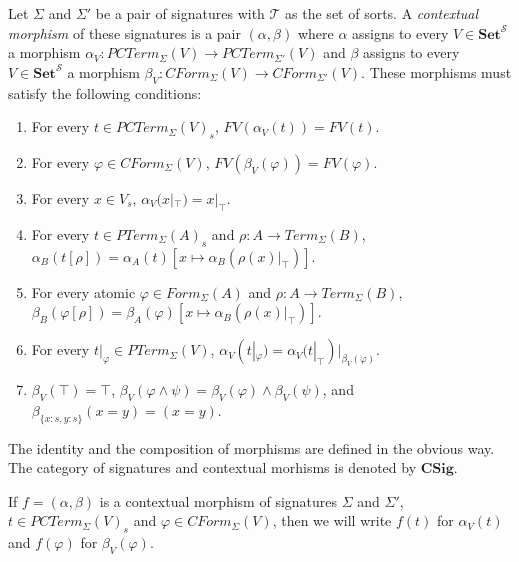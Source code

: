 \documentclass{amsart}
\theoremstyle{definition}
\theoremstyle{remark}
\newcommand{\cat}[1]{\mathbf{#1}}
\newcommand{\Set}{\cat{Set}}
\newcommand{\CSig}{\cat{CSig}}
\numberwithin{figure}{section}
\begin{document}
\begin{defn}
Let $\Sigma$ and $\Sigma'$ be a pair of signatures with $\mathcal{T}$ as the set of sorts.
A \emph{contextual morphism} of these signatures is a pair $(\alpha,\beta)$ where $\alpha$ assigns to every $V \in \Set^\mathcal{S}$
a morphism $\alpha_V : PCTerm_\Sigma(V) \to PCTerm_{\Sigma'}(V)$
and $\beta$ assigns to every $V \in \Set^\mathcal{S}$ a morphism $\beta_V : CForm_\Sigma(V) \to CForm_{\Sigma'}(V)$.
These morphisms must satisfy the following conditions:
\begin{enumerate}
\item For every $t \in PCTerm_\Sigma(V)_s$, $FV(\alpha_V(t)) = FV(t)$.
\label{mor-sig-a-fv}
\item For every $\varphi \in CForm_\Sigma(V)$, $FV(\beta_V(\varphi)) = FV(\varphi)$.
\label{mor-sig-b-fv}
\item For every $x \in V_s$, $\alpha_V(x|_\top) = x|_\top$.
\label{mor-sig-a-var}
\item For every $t \in PTerm_\Sigma(A)_s$ and $\rho : A \to Term_\Sigma(B)$, $\alpha_B(t[\rho]) = \alpha_A(t)[x \mapsto \alpha_B(\rho(x)|_\top)]$.
\label{mor-sig-a-subst}
\item For every atomic $\varphi \in Form_\Sigma(A)$ and $\rho : A \to Term_\Sigma(B)$, $\beta_B(\varphi[\rho]) = \beta_A(\varphi)[x \mapsto \alpha_B(\rho(x)|_\top)]$.
\label{mor-sig-b-subst}
\item For every $t|_\varphi \in PTerm_\Sigma(V)$, $\alpha_V(t|_\varphi) = \alpha_V(t|_\top)|_{\beta_V(\varphi)}$.
\label{mor-sig-a-op}
\item $\beta_V(\top) = \top$, $\beta_V(\varphi \land \psi) = \beta_V(\varphi) \land \beta_V(\psi)$, and $\beta_{\{ x : s, y : s \}}(x = y) = (x = y)$.
\label{mor-sig-b-op}
\end{enumerate}
The identity and the composition of morphisms are defined in the obvious way.
The category of signatures and contextual morhisms is denoted by $\CSig$.
\end{defn}

If $f = (\alpha,\beta)$ is a contextual morphism of signatures $\Sigma$ and $\Sigma'$, $t \in PCTerm_\Sigma(V)_s$ and $\varphi \in CForm_\Sigma(V)$,
then we will write $f(t)$ for $\alpha_V(t)$ and $f(\varphi)$ for $\beta_V(\varphi)$.
\end{document}
